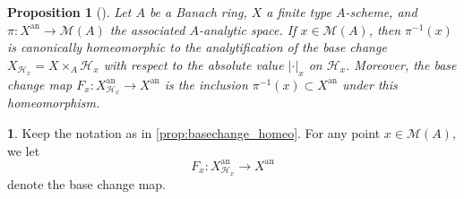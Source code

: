 \documentclass[11pt,reqno]{amsart}
\newcommand{\sH}{{\mathscr H}}
\newcommand{\sM}{{\mathscr M}}
\theoremstyle{theorem}
\numberwithin{equation}{subsection}
\newtheorem{prop}[subsubsection]{Proposition}
\numberwithin{equation}{subsection}
\theoremstyle{definition}
\newtheorem{notation}[subsubsection]{\text{Notation}}
\theoremstyle{remark}
\numberwithin{equation}{subsubsection} \numberwithin{figure}{section}
\DeclareMathOperator{\an}{an}
\begin{document}
\begin{prop}[]\label{prop:basechange_homeo}
Let $A$ be a Banach ring, $X$ a finite type $A$-scheme, and $\pi\colon X^{\an} \to \sM(A)$ the associated $A$-analytic space. 
If $x\in \sM(A)$, then $\pi^{-1}(x)$ is canonically homeomorphic to the analytification of the base change $X_{\sH_x} = X \times_A \sH_x$ with respect to the absolute value $|\cdot|_x$ on $\sH_x$. 
Moreover, the base change map $F_x\colon X^{\an}_{\sH_x} \to X^{\an}$ is the inclusion $\pi^{-1}(x) \subset X^{\an}$ under this homeomorphism. 
\end{prop}

\begin{notation}\label{notion:basechange}
Keep the notation as in \autoref{prop:basechange_homeo}. 
For any point $x\in \sM(A)$, we let 
\[
F_x\colon X^{\an}_{\sH_x} \to X^{\an}
\]
denote the base change map. 
\end{notation}
\end{document}

